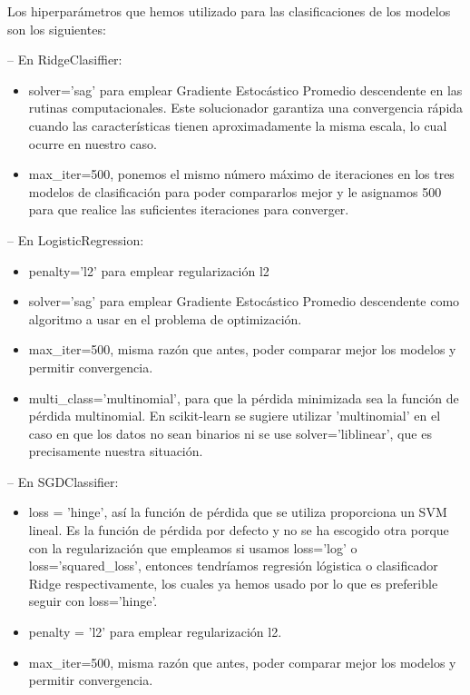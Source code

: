 \documentclass[12pt]{article}
\begin{document}
Los hiperparámetros que hemos utilizado para las clasificaciones de los modelos son los siguientes:

-- En RidgeClasiffier:
\begin{itemize}
		\item solver='sag' para emplear Gradiente Estocástico Promedio descendente en las rutinas computacionales. Este solucionador garantiza una convergencia rápida cuando las características tienen aproximadamente la misma escala, lo cual ocurre en nuestro caso.
        \item max\_iter=500, ponemos el mismo número máximo de iteraciones en los tres modelos de clasificación para poder compararlos mejor y le asignamos 500 para que realice las suficientes iteraciones para converger.
\end{itemize}

-- En LogisticRegression:
\begin{itemize}
		\item penalty='l2' para emplear regularización l2
        \item solver='sag' para emplear Gradiente Estocástico Promedio descendente como algoritmo a usar en el problema de optimización.
        \item max\_iter=500, misma razón que antes, poder comparar mejor los modelos y permitir convergencia.
        \item multi\_class='multinomial', para que la pérdida minimizada sea la función de pérdida multinomial. En scikit-learn se sugiere utilizar 'multinomial' en el caso en que los datos no sean binarios ni se use solver='liblinear', que es precisamente nuestra situación.
\end{itemize}

-- En SGDClassifier:
\begin{itemize}
		\item loss = 'hinge', así la función de pérdida que se utiliza proporciona un SVM lineal. Es la función de pérdida por defecto y no se ha escogido otra porque con la regularización que empleamos si usamos loss='log' o loss='squared\_loss', entonces tendríamos regresión lógistica o clasificador Ridge respectivamente, los cuales ya hemos usado por lo que es preferible seguir con loss='hinge'.
        \item penalty = 'l2' para emplear regularización l2.
        \item max\_iter=500, misma razón que antes, poder comparar mejor los modelos y permitir convergencia.
\end{itemize}
\end{document}
